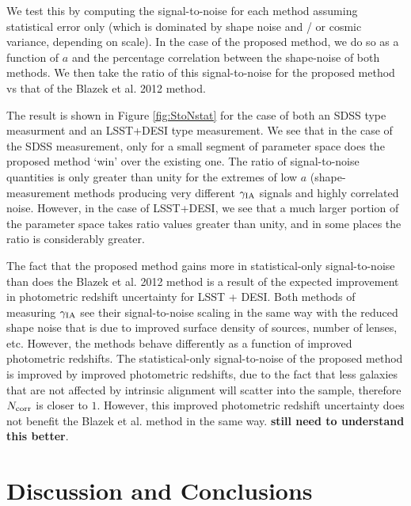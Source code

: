 \documentclass[twocolumn,amsmath,aps,fleqn, superscriptaddress]{revtex4}
\begin{document}
We test this by computing the signal-to-noise for each method assuming statistical error only (which is dominated by shape noise and / or cosmic variance, depending on scale). In the case of the proposed method, we do so as a function of $a$ and the percentage correlation between the shape-noise of both methods. We then take the ratio of this signal-to-noise for the proposed method vs that of the Blazek et al. 2012 method.

The result is shown in Figure \ref{fig:StoNstat} for the case of both an SDSS type measurment and an LSST+DESI type measurement. We see that in the case of the SDSS measurement, only for a small segment of parameter space does the proposed method `win' over the existing one. The ratio of signal-to-noise quantities is only greater than unity for the extremes of low $a$ (shape-measurement methods producing very different $\gamma_{\rm IA}$ signals and highly correlated noise. However, in the case of LSST+DESI, we see that a much larger portion of the parameter space takes ratio values greater than unity, and in some places the ratio is considerably greater.

The fact that the proposed method gains more in statistical-only signal-to-noise than does the Blazek et al. 2012 method is a result of the expected improvement in photometric redshift uncertainty for LSST + DESI. Both methods of measuring $\gamma_{\rm IA}$ see their signal-to-noise scaling in the same way with the reduced shape noise that is due to improved surface density of sources, number of lenses, etc. However, the methods behave differently as a function of improved photometric redshifts. The statistical-only signal-to-noise of the proposed method is improved by improved photometric redshifts, due to the fact that less galaxies that are not affected by intrinsic alignment will scatter into the sample, therefore $N_{\rm corr}$ is closer to $1$. However, this improved photometric redshift uncertainty does not benefit the Blazek et al. method in the same way. {\bf still need to understand this better}.

\begin{figure*}
\centering
{}
\caption{Ratio of statistical-only signal-to-noise for the proposed method vs the method of \cite{Blazek2012}. Left: SDSS. Right: LSST+DESI.}
\label{fig:StoNstat}
\end{figure*}

\section{Discussion and Conclusions}
\label{sec:conclusion}



\end{document}
